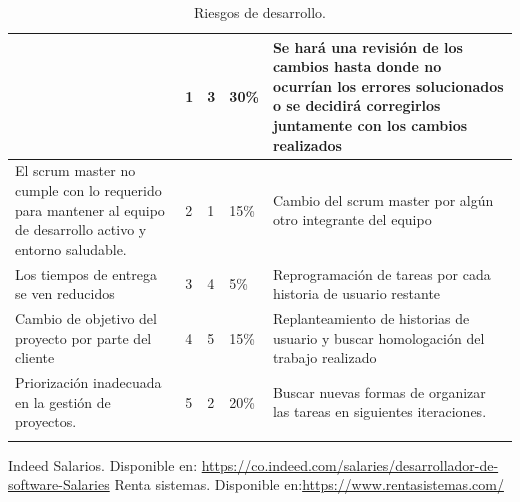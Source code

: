 \documentclass[a4paper,12 pt]{article}
\begin{document}
{\begin{longtable}{|M{4cm}|M{1cm}|M{1.5cm}|M{2.5cm}|M{6cm}|}
    & 1 & 3  & 30\%  
    & Se hará una revisión de los cambios hasta donde no ocurrían los errores solucionados o se decidirá corregirlos juntamente con los cambios realizados  \\
    \hline
    El scrum master no cumple con lo requerido para mantener al equipo de desarrollo activo y entorno saludable.
    & 2 & 1  &  15\%
    &  Cambio del scrum master por algún otro integrante del equipo  \\
    \hline
    Los tiempos de entrega se ven reducidos
    & 3 &  4 & 5\%  
    &  Reprogramación de tareas por cada historia de usuario restante \\
    \hline
    Cambio de objetivo del proyecto por parte del cliente
    & 4 & 5  & 15\%  
    & Replanteamiento de historias de usuario y buscar homologación del trabajo realizado  \\
    \hline
    Priorización inadecuada en la gestión de proyectos.
    & 5 & 2  & 20\%
    & Buscar nuevas formas de organizar las tareas en siguientes iteraciones. \\
    \hline
    \caption{Riesgos de desarrollo.} 
    \label{Riesgos}
\end{longtable}}

\begin{thebibliography}{50}
 Indeed Salarios. Disponible en: 
\url{https://co.indeed.com/salaries/desarrollador-de-software-Salaries}
 Renta sistemas. Disponible en:\url{https://www.rentasistemas.com/}

\end{thebibliography}{}
\end{document}
